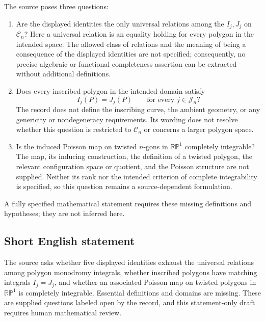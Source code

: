 \documentclass[11pt]{article}
\begin{document}
The source poses three questions:
\begin{enumerate}
\item Are the displayed identities the only universal relations among the \(I_j,J_j\) on \(\mathcal C_n\)? Here a universal relation is an equality holding for every polygon in the intended space. The allowed class of relations and the meaning of being a consequence of the displayed identities are not specified; consequently, no precise algebraic or functional completeness assertion can be extracted without additional definitions.
\item Does every inscribed polygon in the intended domain satisfy
\[
 I_j(P)=J_j(P)\qquad\text{for every }j\in\mathcal J_n?
\]
The record does not define the inscribing curve, the ambient geometry, or any genericity or nondegeneracy requirements. Its wording does not resolve whether this question is restricted to \(\mathcal C_n\) or concerns a larger polygon space.
\item Is the induced Poisson map on twisted \(n\)-gons in \(\mathbb{RP}^{1}\) completely integrable? The map, its inducing construction, the definition of a twisted polygon, the relevant configuration space or quotient, and the Poisson structure are not supplied. Neither its rank nor the intended criterion of complete integrability is specified, so this question remains a source-dependent formulation.
\end{enumerate}
A fully specified mathematical statement requires these missing definitions and hypotheses; they are not inferred here.
\subsection{Short English statement}
The source asks whether five displayed identities exhaust the universal relations among polygon monodromy integrals, whether inscribed polygons have matching integrals \(I_j=J_j\), and whether an associated Poisson map on twisted polygons in \(\mathbb{RP}^{1}\) is completely integrable. Essential definitions and domains are missing. These are supplied questions labeled open by the record, and this statement-only draft requires human mathematical review.
\end{document}
